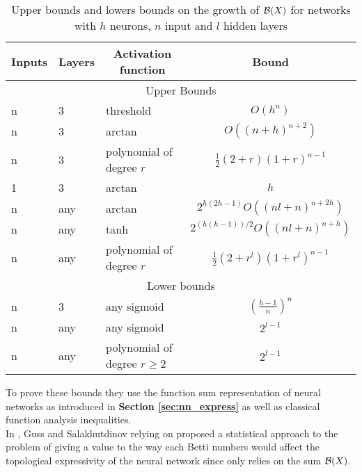 \documentclass[12pt, a4paper]{article}
\begin{document}
\begin{table}[H]
  \begin{center}
    \begin{tabular}{| l | l | l | c |}
      \hline
Inputs                  & \multicolumn{1}{c|}{Layers} & \multicolumn{1}{c|}{Activation function} & \multicolumn{1}{c|}{Bound} \\
      \hline
\multicolumn{4}{|c|}{Upper Bounds}                            \\
      \hline
n      & 3      & threshold           & $O(h^n)$            \\
      \hline
n      & 3      & arctan           & $O((n+h)^{n+2})$            \\
      \hline
n      & 3      & polynomial of degree $r$           & $\frac{1}{2}(2+r)(1+r)^{n-1}$            \\
      \hline
1      & 3      & arctan           & $h$            \\
      \hline
n      & any    & arctan           & $2^{h(2h-1)}O((nl+n)^{n+2h})$            \\
      \hline
n      & any    & tanh           & $2^{(h(h-1))/2}O((nl+n)^{n+h})$            \\
      \hline
n      & any      & polynomial of degree $r$           & $\frac{1}{2}(2+r^l)(1+r^l)^{n-1}$            \\
      \hline
\multicolumn{4}{|c|}{Lower bounds}                            \\
      \hline
n      & 3      & any sigmoid         & $(\frac{h-1}{n})^n$\\
      \hline
n      & any & any sigmoid         & $2^{l-1}$ \\
      \hline
n      & any      & polynomial of degree $r \ge 2$    & $2^{l-1}$\\
      \hline
\end{tabular}
  \end{center}
  
  \caption{Upper bounds and lowers bounds on the growth of $\mathcal{B}(X)$ for networks with $h$ neurons, $n$ input and $l$ hidden layers}
  \label{tab:betti_up_low_bound}
\end{table}

To prove these bounds they use the function sum representation of neural networks as introduced in \textbf{Section \ref{sec:nn_express}} as well as classical function analysis inequalities.\\

In \cite{guss_characterizing_2018}, Guss and Salakhutdinov relying on \cite{bianchini_complexity_2014} proposed a statistical approach to the problem of giving a value to the way each Betti numbers would affect the topological expressivity of the neural network since \cite{bianchini_complexity_2014} only relies on the sum $\mathcal{B}(X)$.\\
\end{document}
